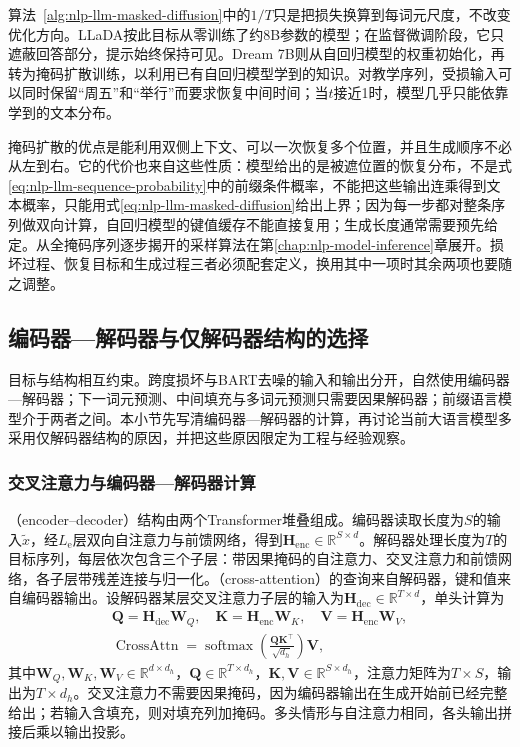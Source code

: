 算法~\ref{alg:nlp-llm-masked-diffusion}中的$1/T$只是把损失换算到每词元尺度，不改变优化方向。LLaDA按此目标从零训练了约8B参数的模型；在监督微调阶段，它只遮蔽回答部分，提示始终保持可见。Dream 7B则从自回归模型的权重初始化，再转为掩码扩散训练，以利用已有自回归模型学到的知识。对教学序列，受损输入可以同时保留“周五”和“举行”而要求恢复中间时间；当$t$接近1时，模型几乎只能依靠学到的文本分布。

掩码扩散的优点是能利用双侧上下文、可以一次恢复多个位置，并且生成顺序不必从左到右。它的代价也来自这些性质：模型给出的是被遮位置的恢复分布，不是式\eqref{eq:nlp-llm-sequence-probability}中的前缀条件概率，不能把这些输出连乘得到文本概率，只能用式\eqref{eq:nlp-llm-masked-diffusion}给出上界；因为每一步都对整条序列做双向计算，自回归模型的键值缓存不能直接复用；生成长度通常需要预先给定。从全掩码序列逐步揭开的采样算法在第\ref{chap:nlp-model-inference}章展开。损坏过程、恢复目标和生成过程三者必须配套定义，换用其中一项时其余两项也要随之调整。

\subsection{编码器—解码器与仅解码器结构的选择}
\label{sec:nlp-llm-objective-architecture}

目标与结构相互约束。跨度损坏与BART去噪的输入和输出分开，自然使用编码器—解码器；下一词元预测、中间填充与多词元预测只需要因果解码器；前缀语言模型介于两者之间。本小节先写清编码器—解码器的计算，再讨论当前大语言模型多采用仅解码器结构的原因，并把这些原因限定为工程与经验观察。

\subsubsection{交叉注意力与编码器—解码器计算}
\label{sec:nlp-llm-objective-cross-attention}

（encoder--decoder）结构由两个Transformer堆叠组成。编码器读取长度为$S$的输入$\tilde x$，经$L_{\mathrm e}$层双向自注意力与前馈网络，得到$\bm H_{\mathrm{enc}}\in\mathbb R^{S\times d}$。解码器处理长度为$T$的目标序列，每层依次包含三个子层：带因果掩码的自注意力、交叉注意力和前馈网络，各子层带残差连接与归一化。（cross-attention）的查询来自解码器，键和值来自编码器输出。设解码器某层交叉注意力子层的输入为$\bm H_{\mathrm{dec}}\in\mathbb R^{T\times d}$，单头计算为
\begin{equation}
 \begin{gathered}
 \bm Q=\bm H_{\mathrm{dec}}\bm W_Q,\quad
 \bm K=\bm H_{\mathrm{enc}}\bm W_K,\quad
 \bm V=\bm H_{\mathrm{enc}}\bm W_V,\\
 \operatorname{CrossAttn}=\operatorname{softmax}\!\left(\frac{\bm Q\bm K^{\top}}{\sqrt{d_h}}\right)\bm V,
 \end{gathered}
 \label{eq:nlp-llm-cross-attention}
\end{equation}
其中$\bm W_Q,\bm W_K,\bm W_V\in\mathbb R^{d\times d_h}$，$\bm Q\in\mathbb R^{T\times d_h}$，$\bm K,\bm V\in\mathbb R^{S\times d_h}$，注意力矩阵为$T\times S$，输出为$T\times d_h$。交叉注意力不需要因果掩码，因为编码器输出在生成开始前已经完整给出；若输入含填充，则对填充列加掩码。多头情形与自注意力相同，各头输出拼接后乘以输出投影。

